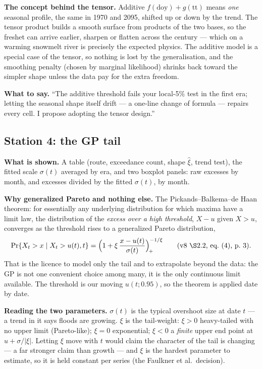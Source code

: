 \documentclass[11pt]{article}
\begin{document}
\textbf{The concept behind the tensor.} Additive
$f(\mathrm{doy}) + g(\mathrm{tt})$ means \emph{one} seasonal profile, the
same in 1970 and 2095, shifted up or down by the trend. The tensor product
builds a smooth surface from products of the two bases, so the freshet can
arrive earlier, sharpen or flatten across the century --- which on a warming
snowmelt river is precisely the expected physics. The additive model is a
special case of the tensor, so nothing is lost by the generalisation, and the
smoothing penalty (chosen by marginal likelihood) shrinks back toward the
simpler shape unless the data pay for the extra freedom.

\textbf{What to say.} ``The additive threshold fails your local-5\% test in
the first era; letting the seasonal shape itself drift --- a one-line change
of formula --- repairs every cell. I propose adopting the tensor design.''

\subsection{Station 4: the GP tail}
\label{sec:gp}

\textbf{What is shown.} A table (route, exceedance count, shape $\hat\xi$,
trend test), the fitted scale $\sigma(t)$ averaged by era, and two boxplot
panels: raw excesses by month, and excesses divided by the fitted
$\sigma(t)$, by month.

\textbf{Why generalized Pareto and nothing else.} The Pickands--Balkema--de
Haan theorem: for essentially any underlying distribution for which maxima
have a limit law, the distribution of the \emph{excess over a high
threshold}, $X-u$ given $X>u$, converges as the threshold rises to a
generalized Pareto distribution,
\[
\Pr\{X_t > x \mid X_t > u(t), t\}
= \Bigl(1 + \xi\,\frac{x-u(t)}{\sigma(t)}\Bigr)_{\!+}^{-1/\xi}
\qquad \text{(v8~\S2.2, eq.~(4), p.~3).}
\]
That is the licence to model only the tail and to extrapolate beyond the
data: the GP is not one convenient choice among many, it is the only
continuous limit available. The threshold is our moving $u(t;0.95)$, so the
theorem is applied date by date.

\textbf{Reading the two parameters.} $\sigma(t)$ is the typical overshoot
size at date $t$ --- a trend in it says floods are growing. $\xi$ is the
tail-weight: $\xi > 0$ heavy-tailed with no upper limit (Pareto-like);
$\xi = 0$ exponential; $\xi < 0$ a \emph{finite} upper end point at
$u + \sigma/|\xi|$. Letting $\xi$ move with $t$ would claim the character of
the tail is changing --- a far stronger claim than growth --- and $\xi$ is the
hardest parameter to estimate, so it is held constant per series (the
Faulkner et al.\ decision).
\end{document}
